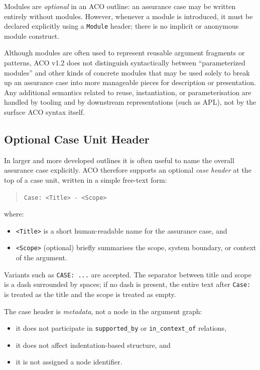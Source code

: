 \documentclass[11pt,twoside,a4paper]{article}
\begin{document}
Modules are \emph{optional} in an ACO outline: an assurance case may be written entirely
without modules. However, whenever a module is introduced, it must be declared explicitly
using a \texttt{Module} header; there is no implicit or anonymous module construct.

Although modules are often used to represent reusable argument fragments or patterns,
ACO v1.2 does not distinguish syntactically between ``parameterized modules'' and other kinds
of concrete modules that may be used solely to break up an assurance case into more manageable pieces for description or presentation. Any additional semantics related to reuse, instantiation, or parameterisation
are handled by tooling and by downstream representations (such as APL), not by the
surface ACO syntax itself.


\subsection{Optional Case Unit Header}

In larger and more developed outlines it is often useful to name the overall assurance case explicitly.
ACO therefore supports an optional \emph{case header} at the top of a case unit, written
in a simple free-text form:

\begin{quote}
\texttt{Case: \textless Title\textgreater{} - \textless Scope\textgreater}
\end{quote}

where:
\begin{itemize}[leftmargin=2em]
  \item \texttt{\textless Title\textgreater{}} is a short human-readable name for the assurance case, and
  \item \texttt{\textless Scope\textgreater{}} (optional) briefly summarises the scope, system boundary,
        or context of the argument.
\end{itemize}

Variants such as \texttt{CASE: ...} are accepted. The separator between title and scope
is a dash surrounded by spaces; if no dash is present, the entire text after
\texttt{Case:} is treated as the title and the scope is treated as empty.

The case header is \emph{metadata}, not a node in the argument graph:
\begin{itemize}[leftmargin=2em]
  \item it does not participate in \texttt{supported\_by} or \texttt{in\_context\_of} relations,
  \item it does not affect indentation-based structure, and
  \item it is not assigned a node identifier.
\end{itemize}
\end{document}
